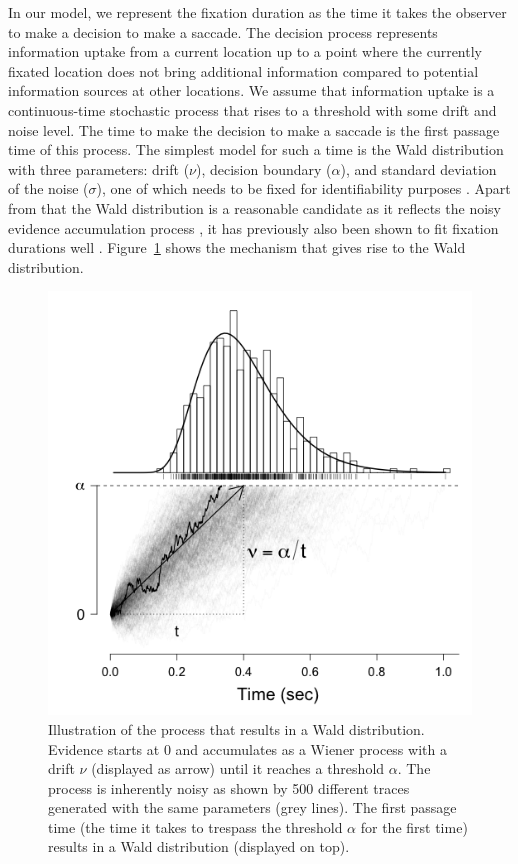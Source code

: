\documentclass{article}
\begin{document}
In our model, we represent the fixation duration as the time it takes the observer to make a decision to make a saccade. The decision process represents information uptake from a current location up to a point where the currently fixated location does not bring additional information compared to potential information sources at other locations. We assume that information uptake is a continuous-time stochastic process that rises to a threshold with some drift and noise level. The time to make the decision to make a saccade is the first passage time of this process. The simplest model for such a time is the Wald distribution with three parameters: drift ($\nu$), decision boundary ($\alpha$), and standard deviation of the noise ($\sigma$), one of which needs to be fixed for identifiability purposes \citep{chhikara1988inverse}. Apart from that the Wald distribution is a reasonable candidate as it reflects the noisy evidence accumulation process \citep[a process that has been deemed as a neurally plausible mechanism for decision processes, ][]{anders2016shifted}, it has previously also been shown to fit fixation durations well \citep{palmer2011shapes}. Figure~\ref{fig:wald_distribution} shows the mechanism that gives rise to the Wald distribution.

\begin{figure}
    \centering
    \includegraphics[width=\linewidth]{figures/wald_distribution.png}
    \caption{Illustration of the process that results in a Wald distribution. Evidence starts at 0 and accumulates as a Wiener process with a drift $\nu$ (displayed as arrow) until it reaches a threshold $\alpha$. The process is inherently noisy as shown by 500 different traces generated with the same parameters (grey lines). The first passage time (the time it takes to trespass the threshold $\alpha$ for the first time) results in a Wald distribution (displayed on top).}
    \label{fig:wald_distribution}
\end{figure}
\end{document}
